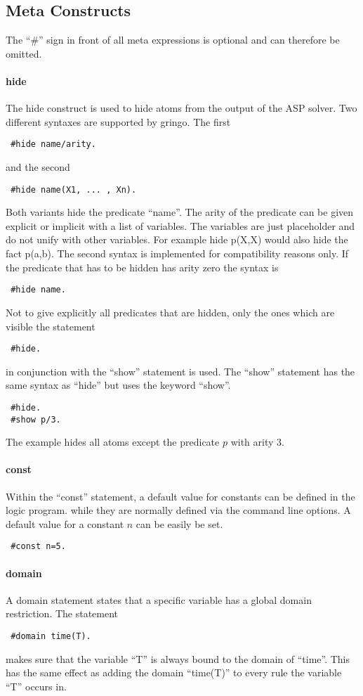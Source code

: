 \documentclass[a4paper,10pt]{article}
\begin{document}
\subsection{Meta Constructs}
The ``\#'' sign in front of all meta expressions is optional and can therefore be omitted.
\paragraph{hide}
The hide construct is used to hide atoms from the output of the ASP solver.
Two different syntaxes are supported by gringo.
The first 
\begin{verbatim}
 #hide name/arity.
\end{verbatim}
and the second
\begin{verbatim}
 #hide name(X1, ... , Xn).
\end{verbatim}
Both variants hide the predicate ``name''.
The arity of the predicate can be given explicit or implicit with a list of variables.
The variables are just placeholder and do not unify with other variables. For example hide p(X,X) would also hide the fact p(a,b). The second syntax is implemented for compatibility reasons only.
If the predicate that has to be hidden has arity zero the syntax is
\begin{verbatim}
 #hide name.
\end{verbatim}
Not to give explicitly all predicates that are hidden, only the ones which are visible the statement
\begin{verbatim}
 #hide.
\end{verbatim}
in conjunction with the ``show'' statement is used.
The ``show'' statement has the same syntax as ``hide'' but uses the keyword ``show''.
\begin{verbatim}
 #hide.
 #show p/3.
\end{verbatim}
The example hides all atoms except the predicate $p$ with arity $3$.
\paragraph{const}
Within the ``const'' statement, a default value for constants can be defined in the logic program.
while they are normally defined via the command line options.
A default value for a constant $n$ can be easily be set.
\begin{verbatim}
 #const n=5.
\end{verbatim}
\paragraph{domain}
A domain statement states that a specific variable has a global domain restriction.
The statement
\begin{verbatim}
 #domain time(T).
\end{verbatim}
makes sure that the variable ``T'' is always bound to the domain of ``time''.
This has the same effect as adding the domain ``time(T)'' to every rule the variable ``T'' occurs in.
\end{document}
